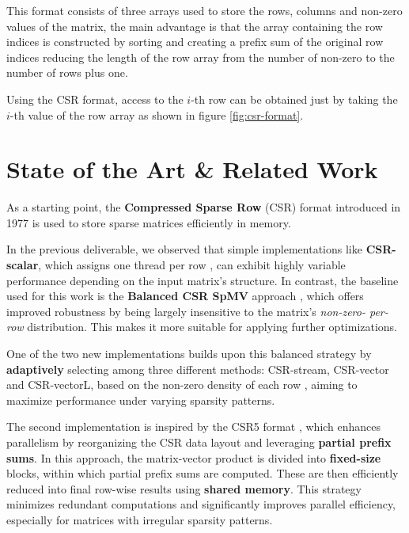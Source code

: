 \documentclass[conference]{IEEEtran}
\begin{document}
    This format consists of three arrays used to store the rows, columns and
    non-zero values of the matrix, the main advantage is that the array
    containing the row indices is constructed by sorting and creating a prefix
    sum of the original row indices reducing the length of the row array from
    the number of non-zero to the number of rows plus one.

    Using the CSR format, access to the $i$-th row can be obtained just by
    taking the $i$-th value of the row array as shown in figure
    \ref{fig:csr-format}.

    \section{State of the Art \& Related Work}

    As a starting point, the \textbf{Compressed Sparse Row} (CSR) format
    \cite{eisenstat1977csr} introduced in 1977 is used to store sparse matrices
    efficiently in memory.

    In the previous deliverable, we observed that simple implementations like
    \textbf{CSR-scalar}, which assigns one thread per row
    \cite{isupov2021spmvhp}, can exhibit highly variable performance depending
    on the input matrix's structure.
    In contrast, the baseline used for this work is the \textbf{Balanced CSR
    SpMV} approach \cite{flegar2017balancedcsr}, which offers improved
    robustness by being largely insensitive to the matrix's \textit{non-zero-
    per-row} distribution.
    This makes it more suitable for applying further optimizations.

    One of the two new implementations builds upon this balanced strategy by
    \textbf{adaptively} selecting among three different methods: CSR-stream,
    CSR-vector and CSR-vectorL, based on the non-zero density of each row
    \cite{daga2015adaptivesparse}, aiming to maximize performance under varying
    sparsity patterns.

    The second implementation is inspired by the CSR5 format \cite{liu2015csr5},
    which enhances parallelism by reorganizing the CSR data layout and
    leveraging \textbf{partial prefix sums}.
    In this approach, the matrix-vector product is divided into \textbf{fixed-size}
    blocks, within which partial prefix sums are computed.
    These are then efficiently reduced into final row-wise results using
    \textbf{shared memory}.
    This strategy minimizes redundant computations and significantly improves
    parallel efficiency, especially for matrices with irregular sparsity
    patterns.
\end{document}
